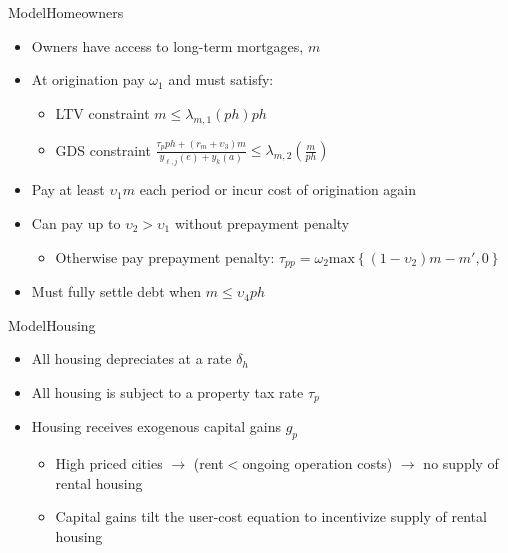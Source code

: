 \documentclass[11pt,aspectratio=169]{beamer}
\begin{document}
\begin{frame}{Model}{Homeowners}

\begin{itemize}
    \item Owners have access to long-term mortgages, $m$
    \item At origination pay $\omega_{1}$ and must satisfy:
    \begin{itemize}
        \item LTV constraint $m \leq \lambda_{m,1}(ph) p h$
        \item GDS constraint $\frac{\tau_{p}ph+(r_{m}+\upsilon_{3})m}{y_{\ell,j}(e)+y_{k}(a)} \leq \lambda_{m,2}\left(\frac{m}{ph}\right)$
    \end{itemize}
    \item Pay at least $\upsilon_{1}m$ each period or incur cost of origination again
    \item Can pay up to $\upsilon_{2}>\upsilon_{1}$ without prepayment penalty
    \begin{itemize}
        \item Otherwise pay prepayment penalty: $\tau_{pp}=\omega_{2}\mbox{max}\left\{(1-\upsilon_{2})m-m',0\right\}$
    \end{itemize}
    \item Must fully settle debt when $m\leq \upsilon_{4}ph$
\end{itemize}

\end{frame}

\begin{frame}{Model}{Housing}

\begin{itemize}
    \item All housing depreciates at a rate $\delta_{h}$
    \item All housing is subject to a property tax rate $\tau_{p}$
    \item Housing receives exogenous capital gains $g_{p}$
    \begin{itemize}
        \item High priced cities $\rightarrow$ (rent$<$ongoing operation costs) $\rightarrow$ no supply of rental housing
        \item Capital gains tilt the user-cost equation to incentivize supply of rental housing
    \end{itemize}
\end{itemize}

\end{frame}
\end{document}
